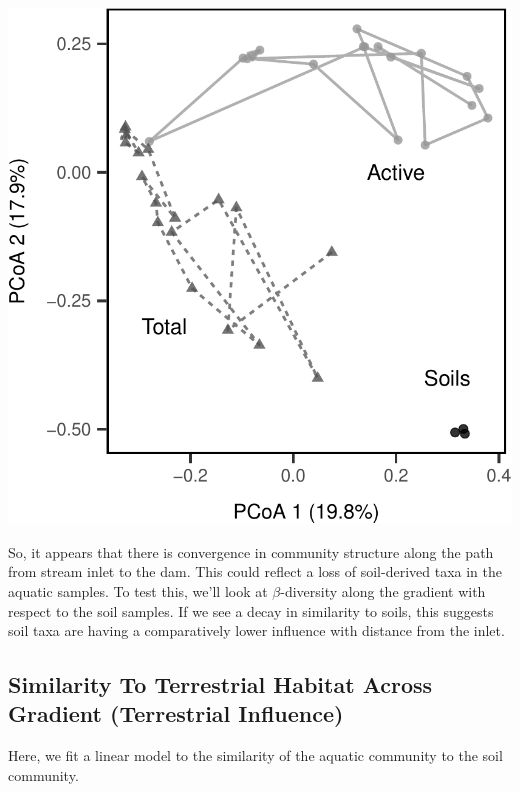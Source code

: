 \documentclass[]{article}
\begin{document}
\begin{center}\includegraphics{ReservoirGradient_files/figure-latex/ordination-1} \end{center}

So, it appears that there is convergence in community structure along
the path from stream inlet to the dam. This could reflect a loss of
soil-derived taxa in the aquatic samples. To test this, we'll look at
\(\beta\)-diversity along the gradient with respect to the soil samples.
If we see a decay in similarity to soils, this suggests soil taxa are
having a comparatively lower influence with distance from the inlet.

\subsection{Similarity To Terrestrial Habitat Across Gradient
(Terrestrial
Influence)}\label{similarity-to-terrestrial-habitat-across-gradient-terrestrial-influence}

Here, we fit a linear model to the similarity of the aquatic community
to the soil community.
\end{document}
